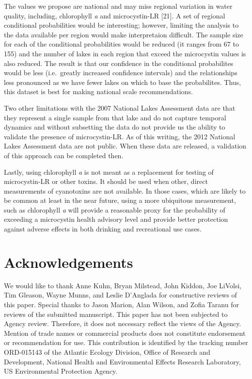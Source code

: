 \documentclass[11pt,]{article}
\begin{document}
The values we propose are national and may miss regional variation in
water quality, including, chlorophyll \emph{a} and microcystin-LR
{[}21{]}. A set of regional conditional probabilities would be
interesting; however, limiting the analysis to the data available per
region would make interpretaion difficult. The sample size for each of
the conditional probabilities would be reduced (it ranges from 67 to
155) and the number of lakes in each region that exceed the microcystin
values is also reduced. The result is that our confidence in the
conditional probabilites would be less (i.e.~greatly increased
confidence intervals) and the relationships less pronounced as we have
fewer lakes on which to base the probabilites. Thus, this dataset is
best for making national scale recommendations.

Two other limitations with the 2007 National Lakes Assessment data are
that they represent a single sample from that lake and do not capture
temporal dynamics and without subsetting the data do not provide us the
ability to validate the presence of microcystin-LR. As of this writing,
the 2012 National Lakes Assessment data are not public. When these data
are released, a validation of this approach can be completed then.

Lastly, using chlorophyll \emph{a} is not meant as a replacement for
testing of microcystin-LR or other toxins. It should be used when other,
direct measurements of cyanotoxins are not available. In those cases,
which are likely to be common at least in the near future, using a more
ubiquitous measurement, such as chlorophyll \emph{a} will provide a
reasonable proxy for the probability of exceeding a microcystin health
advisory level and provide better protection against adverse effects in
both drinking and recreational use cases.

\section{Acknowledgements}\label{acknowledgements}

We would like to thank Anne Kuhn, Bryan Milstead, John Kiddon, Joe
LiVolsi, Tim Gleason, Wayne Munns, and Leslie D'Anglada for constructive
reviews of this paper. Special thanks to Jason Marion, Alan Wilson, and
Zofia Taranu for reviews of the submitted manuscript. This paper has not
been subjected to Agency review. Therefore, it does not necessary
reflect the views of the Agency. Mention of trade names or commercial
products does not constitute endorsement or recommendation for use. This
contribution is identified by the tracking number ORD-015143 of the
Atlantic Ecology Division, Office of Research and Development, National
Health and Environmental Effects Research Laboratory, US Environmental
Protection Agency.
\end{document}
